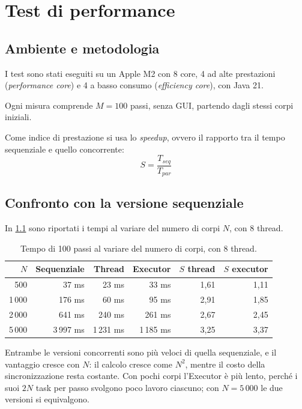 \chapter{Test di performance}

%
\section{Ambiente e metodologia}
I test sono stati eseguiti su un Apple M2 con 8 core, 4 ad alte prestazioni (\emph{performance core}) e 4 a basso consumo (\emph{efficiency core}), con Java 21.

Ogni misura comprende $M = 100$ passi, senza GUI, partendo dagli stessi corpi iniziali.

Come indice di prestazione si usa lo \emph{speedup}, ovvero il rapporto tra il tempo sequenziale e quello concorrente:
\[
  S = \frac{T_{seq}}{T_{par}}
\]

%
%
\section{Confronto con la versione sequenziale}
In \cref{tab:confronto} sono riportati i tempi al variare del numero di corpi $N$, con 8 thread.

\begin{table}[H]
  \centering
  \begin{tabular}{rrrrrr}
    \toprule
    $N$ & Sequenziale & Thread & Executor & $S$ thread & $S$ executor \\
    \midrule
    500    & 37 ms    & 23 ms    & 33 ms    & 1,61 & 1,11 \\
    1\,000 & 176 ms   & 60 ms    & 95 ms    & 2,91 & 1,85 \\
    2\,000 & 641 ms   & 240 ms   & 261 ms   & 2,67 & 2,45 \\
    5\,000 & 3\,997 ms & 1\,231 ms & 1\,185 ms & 3,25 & 3,37 \\
    \bottomrule
  \end{tabular}
  \caption{Tempo di 100 passi al variare del numero di corpi, con 8 thread.}
  \label{tab:confronto}
\end{table}

Entrambe le versioni concorrenti sono più veloci di quella sequenziale, e il vantaggio cresce con $N$: il calcolo cresce come $N^2$, mentre il costo della sincronizzazione resta costante.
Con pochi corpi l'Executor è più lento, perché i suoi $2N$ task per passo svolgono poco lavoro ciascuno; con $N = 5\,000$ le due versioni si equivalgono.

